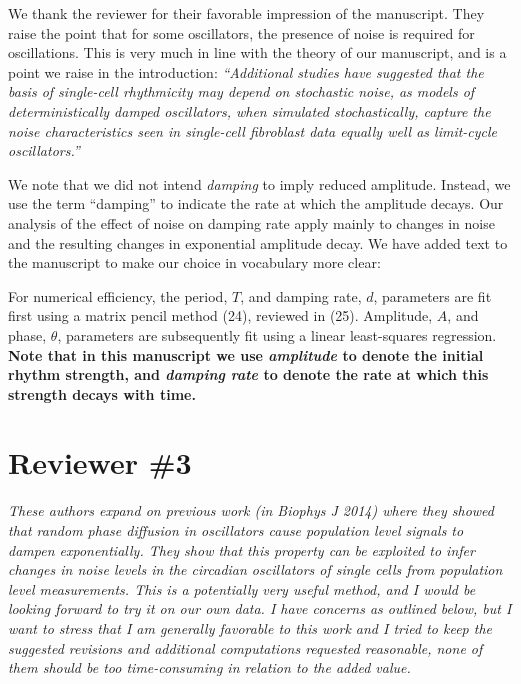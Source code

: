 \documentclass[11pt, letterpaper]{article}
\newenvironment{reviewer}{\itshape\color{gray}}{}
\newenvironment{manuscript}[1]{\begin{center}\begin{tcolorbox}[colback=green!5!white,colframe=green!75!black,width=\textwidth,title={#1},breakable,fonttitle=\bfseries]}{\end{tcolorbox}\end{center}}
\begin{document}
We thank the reviewer for their favorable impression of the manuscript.
They raise the point that for some oscillators, the presence of noise is required for oscillations.
This is very much in line with the theory of our manuscript, and is a point we raise in the introduction:
{\itshape
``Additional studies have suggested that the basis of single-cell rhythmicity may depend on stochastic noise, as models of deterministically damped oscillators, when simulated stochastically, capture the noise characteristics seen in single-cell fibroblast data equally well as limit-cycle oscillators.''}

We note that we did not intend {\itshape damping} to imply reduced amplitude.
Instead, we use the term ``damping'' to indicate the rate at which the amplitude decays.
Our analysis of the effect of noise on damping rate apply mainly to changes in noise and the resulting changes in exponential amplitude decay. We have added text to the manuscript to make our choice in vocabulary more clear:

\begin{manuscript}{Page 10}
 For numerical efficiency, the period, $T$, and damping rate, $d$, parameters are fit first using a matrix pencil method (24), reviewed in (25).
Amplitude, $A$, and phase, $\theta$, parameters are subsequently fit using a linear least-squares regression.
{\bfseries
  Note that in this manuscript we use {\itshape amplitude} to denote the initial rhythm strength, and {\itshape damping rate} to denote the rate at which this strength decays with time.}
\end{manuscript}

\section*{Reviewer \#3}

\begin{reviewer}
These authors expand on previous work (in Biophys J 2014) where they showed that random phase diffusion in oscillators cause population level signals to dampen exponentially. They show that this property can be exploited to infer changes in noise levels in the circadian oscillators of single cells from population level measurements. This is a potentially very useful method, and I would be looking forward to try it on our own data. I have concerns as outlined below, but I want to stress that I am generally favorable to this work and I tried to keep the suggested revisions and additional computations requested reasonable, none of them should be too time-consuming in relation to the added value.
\end{reviewer}
\end{document}
